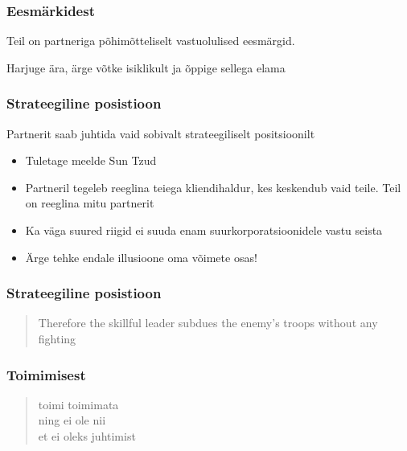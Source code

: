 \begin{frame}[fragile]
  \frametitle{Eesmärkidest}
	\begin{center}
		Teil on partneriga põhimõtteliselt vastuolulised eesmärgid. \par Harjuge ära, ärge võtke isiklikult ja õppige sellega elama
	\end{center}
\end{frame}


\begin{frame}[fragile]
  \frametitle{Strateegiline posistioon}
  	Partnerit saab juhtida vaid sobivalt strateegiliselt positsioonilt	
	\begin{itemize}
		\item Tuletage meelde Sun Tzud
		\item Partneril tegeleb reeglina teiega kliendihaldur, kes keskendub vaid teile. Teil on reeglina mitu partnerit
		\item Ka väga suured riigid ei suuda enam suurkorporatsioonidele vastu seista \citep{partner}
		\item Ärge tehke endale illusioone oma võimete osas!
	\end{itemize}
\end{frame}


\begin{frame}[fragile]
  \frametitle{Strateegiline posistioon}
	\begin{center}
		\begin{quote}
			Therefore the skillful leader subdues the enemy's troops without any fighting
		\end{quote}
	\end{center}
	\cite{tzu2013art}
\end{frame}

\begin{frame}[fragile]
  \frametitle{Toimimisest}
	\begin{center}
		\begin{quote}
	toimi toimimata\\
	ning ei ole nii\\
	et ei oleks juhtimist
   		\end{quote}
	\end{center}
\cite{laozi}
\end{frame}

